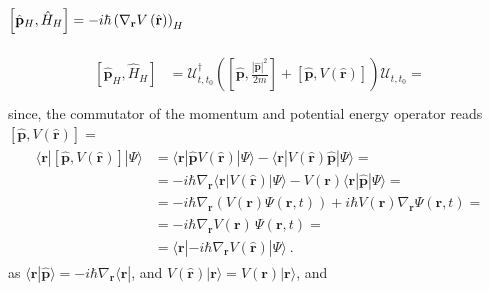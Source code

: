 \documentclass[letterpaper,10pt,english]{jupyterBook}
\begin{document}
\subsubsection*{\protect\(\left[ \hat{\mathbf{p}}_H, \hat{H}_H \right] = - i \hbar \left( \nabla_{\mathbf{r}} V\left( \hat{\mathbf{r}}\right) \right)_H\protect\)}
\begin{equation*}
\begin{split}\begin{aligned}
  \left[ \hat{\mathbf{p}}_H, \hat{H}_H \right] 
  & = \mathscr{U}_{t,t_0}^{\dagger} \left( \left[ \hat{\mathbf{p}}, \frac{\left|\hat{\mathbf{p}}\right|^2}{2m} \right] + \left[ \hat{\mathbf{p}}, V\left(\hat{\mathbf{r}}\right) \right] \right) \mathscr{U}_{t,t_0} = \\
\end{aligned}\end{split}
\end{equation*}
\sphinxAtStartPar
since, the commutator of the momentum and potential energy operator reads \(\left[ \hat{\mathbf{p}}, V(\hat{\mathbf{r}}) \right] = \)
\begin{equation*}
\begin{split}\begin{aligned}
  \langle \mathbf{r} | \left[ \hat{\mathbf{p}}, V\left(\hat{\mathbf{r}}\right) \right] | \Psi \rangle
  & = \langle \mathbf{r} | \hat{\mathbf{p}} V\left(\hat{\mathbf{r}}\right) | \Psi \rangle - \langle \mathbf{r} | V\left(\hat{\mathbf{r}}\right) \hat{\mathbf{p}} | \Psi \rangle = \\
  & = - i \hbar \nabla_{\mathbf{r}} \langle \mathbf{r} | V\left(\hat{\mathbf{r}}\right) | \Psi \rangle - V\left(\mathbf{r}\right) \langle \mathbf{r} | \hat{\mathbf{p}} | \Psi \rangle = \\
  & = - i \hbar \nabla_{\mathbf{r}} \left( V(\mathbf{r}) \Psi(\mathbf{r}, t) \right) + i \hbar V(\mathbf{r}) \nabla_{\mathbf{r}} \Psi(\mathbf{r}, t) = \\
  & = - i \hbar \nabla_{\mathbf{r}} V(\mathbf{r}) \, \Psi(\mathbf{r},t) = \\
  & = \langle \mathbf{r} | - i \hbar \nabla_{\mathbf{r}} V\left( \hat{\mathbf{r}} \right) | \Psi \rangle \ . 
\end{aligned}\end{split}
\end{equation*}
\sphinxAtStartPar
as \(\langle \mathbf{r} | \hat{\mathbf{p}} \rangle = - i \hbar \nabla_{\mathbf{r}} \langle \mathbf{r} |\), and \(V\left( \hat{\mathbf{r}} \right) | \mathbf{r} \rangle = V( \mathbf{r} ) | \mathbf{r} \rangle\), and
\end{document}
